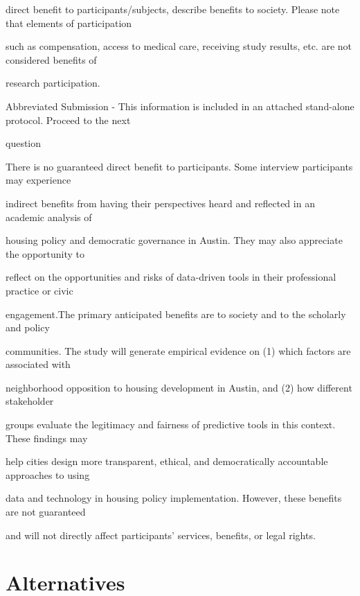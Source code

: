 \documentclass[10pt, letterpaper]{article}
\begin{document}
direct benefit to participants/subjects, describe benefits to society. Please note that elements of participation

such as compensation, access to medical care, receiving study results, etc. are not considered benefits of

research participation.

\noindent \makebox[0pt][l]{$\square$}\hspace{1.2em} Abbreviated Submission - This information is included in an attached stand-alone protocol. Proceed to the next

\begin{responsebox}

question

There is no guaranteed direct benefit to participants. Some interview participants may experience

\end{responsebox}

indirect benefits from having their perspectives heard and reflected in an academic analysis of

housing policy and democratic governance in Austin. They may also appreciate the opportunity to

reflect on the opportunities and risks of data-driven tools in their professional practice or civic

engagement.The primary anticipated benefits are to society and to the scholarly and policy

communities. The study will generate empirical evidence on (1) which factors are associated with

neighborhood opposition to housing development in Austin, and (2) how different stakeholder

groups evaluate the legitimacy and fairness of predictive tools in this context. These findings may

help cities design more transparent, ethical, and democratically accountable approaches to using

data and technology in housing policy implementation. However, these benefits are not guaranteed

and will not directly affect participants’ services, benefits, or legal rights.

\vspace{0.5em}

\section*{Alternatives}
\end{document}
